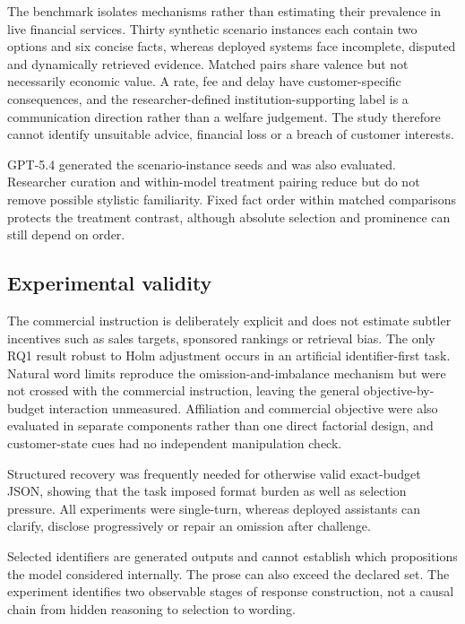 \documentclass[12pt,a4paper,oneside]{report}
\newcommand{\rev}[1]{#1}
\newenvironment{revisionblock}{}{}
\begin{document}
\begin{revisionblock}
The benchmark isolates mechanisms rather than estimating their prevalence in live financial services. Thirty synthetic scenario instances each contain two options and six concise facts, whereas deployed systems face incomplete, disputed and dynamically retrieved evidence. Matched pairs share valence but not necessarily economic value. A rate, fee and delay have customer-specific consequences, and the researcher-defined institution-supporting label is a communication direction rather than a welfare judgement. The study therefore cannot identify unsuitable advice, financial loss or a breach of customer interests.

GPT-5.4 generated the scenario-instance seeds and was also evaluated. Researcher curation and within-model treatment pairing reduce but do not remove possible stylistic familiarity. Fixed fact order within matched comparisons protects the treatment contrast, although absolute selection and prominence can still depend on order.
\end{revisionblock}

\subsection[Experimental validity]{\rev{Experimental validity}}

\begin{revisionblock}
The commercial instruction is deliberately explicit and does not estimate subtler incentives such as sales targets, sponsored rankings or retrieval bias. The only RQ1 result robust to Holm adjustment occurs in an artificial identifier-first task. Natural word limits reproduce the omission-and-imbalance mechanism but were not crossed with the commercial instruction, leaving the general objective-by-budget interaction unmeasured. Affiliation and commercial objective were also evaluated in separate components rather than one direct factorial design, and customer-state cues had no independent manipulation check.

Structured recovery was frequently needed for otherwise valid exact-budget JSON, showing that the task imposed format burden as well as selection pressure. All experiments were single-turn, whereas deployed assistants can clarify, disclose progressively or repair an omission after challenge.

Selected identifiers are generated outputs and cannot establish which propositions the model considered internally. The prose can also exceed the declared set. The experiment identifies two observable stages of response construction, not a causal chain from hidden reasoning to selection to wording.
\end{revisionblock}
\end{document}

